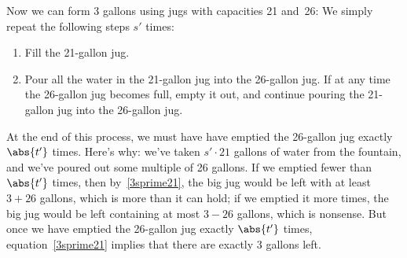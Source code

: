 Now we can form 3 gallons using jugs with capacities 21 and~26:  We
simply repeat the following steps $s'$ times:
\begin{enumerate}
\item Fill the 21-gallon jug.
\item Pour all the water in the 21-gallon jug into the 26-gallon jug.
If at any time the 26-gallon jug becomes full, empty it out, and
continue pouring the 21-gallon jug into the 26-gallon jug.
\end{enumerate}
%
At the end of this process, we must have have emptied the 26-gallon
jug exactly $\abs{t'}$ times.  Here's why: we've taken $s' \cdot 21$
gallons of water from the fountain, and we've poured out some multiple
of 26 gallons.  If we emptied fewer than $\abs{t'}$ times, then
by~\eqref{3sprime21}, the big jug would be left with at least $3+26$
gallons, which is more than it can hold; if we emptied it more times,
the big jug would be left containing at most $3-26$ gallons, which is
nonsense.  But once we have emptied the 26-gallon jug exactly
$\abs{t'}$ times, equation~\eqref{3sprime21} implies that there are
exactly 3 gallons left.

